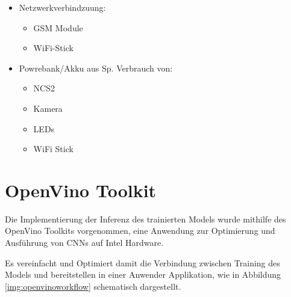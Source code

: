 

\begin{itemize}
    \item Netzwerkverbindzuung:
    \begin{itemize}
        \item GSM Module
        \item WiFi-Stick
    \end{itemize}
    \item Powrebank/Akku aus Sp. Verbrauch von:
    \begin{itemize}
        \item NCS2
        \item Kamera
        \item LEDs
        \item WiFi Stick
    \end{itemize}
\end{itemize}






\section{OpenVino Toolkit}\label{sec:openvino}

Die Implementierung der Inferenz des trainierten Models wurde 
mithilfe des OpenVino Toolkits vorgenommen, eine Anwendung 
zur Optimierung und Ausführung von CNNs auf Intel Hardware.

Es vereinfacht und Optimiert damit die Verbindung zwischen 
Training des Models und bereitstellen in einer Anwender 
Applikation, wie in Abbildung \ref{img:openvinoworkflow} 
schematisch dargestellt.


